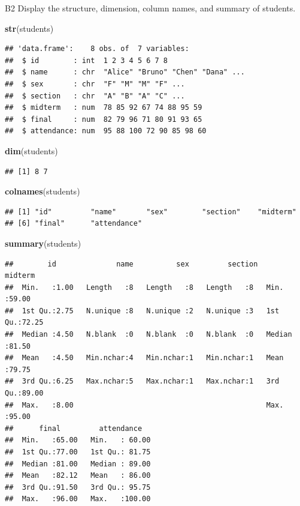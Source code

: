 \documentclass[
]{article}
\newenvironment{Shaded}{\begin{snugshade}}{\end{snugshade}}
\newcommand{\FunctionTok}[1]{\textcolor[rgb]{0.13,0.29,0.53}{\textbf{#1}}}
\newcommand{\NormalTok}[1]{#1}
\begin{document}
B2 Display the structure, dimension, column names, and summary of
students.

\begin{Shaded}
\begin{Highlighting}[]
\FunctionTok{str}\NormalTok{(students)}
\end{Highlighting}
\end{Shaded}

\begin{verbatim}
## 'data.frame':    8 obs. of  7 variables:
##  $ id        : int  1 2 3 4 5 6 7 8
##  $ name      : chr  "Alice" "Bruno" "Chen" "Dana" ...
##  $ sex       : chr  "F" "M" "M" "F" ...
##  $ section   : chr  "A" "B" "A" "C" ...
##  $ midterm   : num  78 85 92 67 74 88 95 59
##  $ final     : num  82 79 96 71 80 91 93 65
##  $ attendance: num  95 88 100 72 90 85 98 60
\end{verbatim}

\begin{Shaded}
\begin{Highlighting}[]
\FunctionTok{dim}\NormalTok{(students)}
\end{Highlighting}
\end{Shaded}

\begin{verbatim}
## [1] 8 7
\end{verbatim}

\begin{Shaded}
\begin{Highlighting}[]
\FunctionTok{colnames}\NormalTok{(students)}
\end{Highlighting}
\end{Shaded}

\begin{verbatim}
## [1] "id"         "name"       "sex"        "section"    "midterm"   
## [6] "final"      "attendance"
\end{verbatim}

\begin{Shaded}
\begin{Highlighting}[]
\FunctionTok{summary}\NormalTok{(students)}
\end{Highlighting}
\end{Shaded}

\begin{verbatim}
##        id              name          sex         section     midterm     
##  Min.   :1.00   Length   :8   Length   :8   Length   :8   Min.   :59.00  
##  1st Qu.:2.75   N.unique :8   N.unique :2   N.unique :3   1st Qu.:72.25  
##  Median :4.50   N.blank  :0   N.blank  :0   N.blank  :0   Median :81.50  
##  Mean   :4.50   Min.nchar:4   Min.nchar:1   Min.nchar:1   Mean   :79.75  
##  3rd Qu.:6.25   Max.nchar:5   Max.nchar:1   Max.nchar:1   3rd Qu.:89.00  
##  Max.   :8.00                                             Max.   :95.00  
##      final         attendance    
##  Min.   :65.00   Min.   : 60.00  
##  1st Qu.:77.00   1st Qu.: 81.75  
##  Median :81.00   Median : 89.00  
##  Mean   :82.12   Mean   : 86.00  
##  3rd Qu.:91.50   3rd Qu.: 95.75  
##  Max.   :96.00   Max.   :100.00
\end{verbatim}
\end{document}
